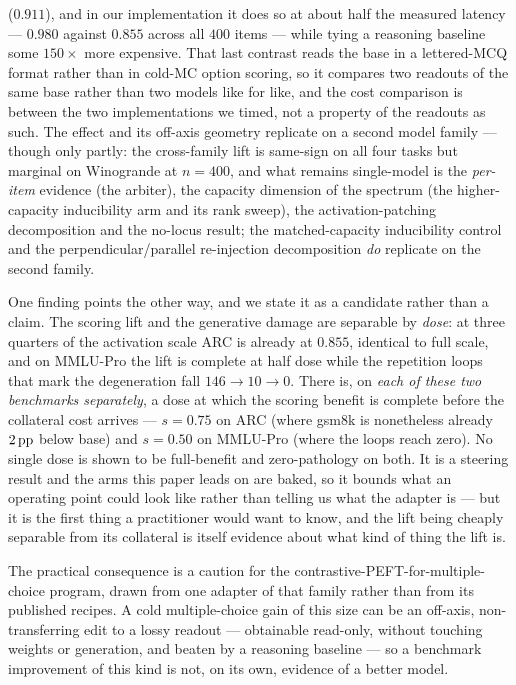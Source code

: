 ($0.911$), and in our implementation it
does so at about half the measured latency
--- $0.980$ against $0.855$ across all $400$ items --- while tying a reasoning
baseline some $150\times$ more expensive. That last contrast reads the base in a
lettered-MCQ format rather than in cold-MC option scoring, so it compares two readouts
of the same base rather than two models like for like, and the cost comparison is
between the two implementations we timed, not a property of the readouts as such.
The effect and its off-axis geometry replicate on a second
model family --- though only partly: the cross-family lift is same-sign on all four
tasks but marginal on Winogrande at $n{=}400$, and what remains single-model is the
\emph{per-item} evidence (the arbiter), the capacity dimension of the spectrum (the
higher-capacity inducibility arm and its rank sweep), the activation-patching
decomposition and the no-locus result; the matched-capacity inducibility control and
the perpendicular/parallel re-injection decomposition \emph{do} replicate on the
second family.

One finding points the other way, and we state it as a candidate rather than a
claim. The scoring lift and the generative damage are separable by \emph{dose}: at
three quarters of the activation scale ARC is already at $0.855$, identical to full
scale, and on MMLU-Pro the lift is complete at half dose while the repetition loops
that mark the degeneration fall $146 \rightarrow 10 \rightarrow 0$. There is, on
\emph{each of these two benchmarks separately}, a dose at which the scoring benefit
is complete before the collateral cost arrives --- $s{=}0.75$ on ARC (where gsm8k is
nonetheless already $2\,\mathrm{pp}$ below base) and
$s{=}0.50$ on MMLU-Pro (where the loops reach zero). No single dose is shown to be
full-benefit and zero-pathology on both. It is a steering result and the arms this
paper leads on are baked, so it
bounds what an operating point could look like rather than telling us what the
adapter is --- but it is the first thing a practitioner would want to know, and the
lift being cheaply separable from its collateral is itself evidence about what kind
of thing the lift is.

The practical consequence is a caution for the contrastive-PEFT-for-multiple-choice
program, drawn from one adapter of that family rather than from its published
recipes. A cold multiple-choice gain of this size can be an off-axis,
non-transferring edit to a lossy readout --- obtainable read-only, without touching
weights or generation, and beaten by a reasoning baseline --- so a benchmark improvement of this
kind is not, on its own, evidence of a better model.
